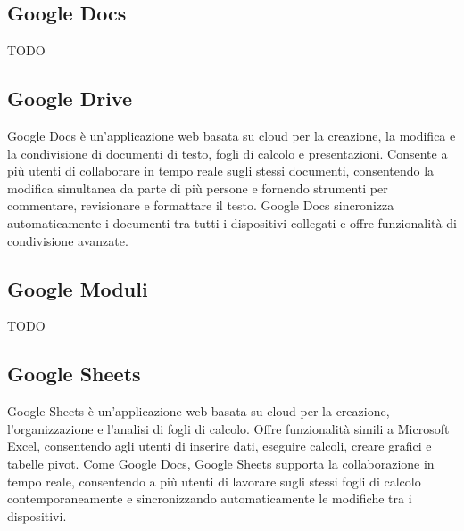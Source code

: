\vspace{2em}
\subsection*{Google Docs}
TODO

\vspace{2em}
\subsection*{Google Drive}
Google Docs è un'applicazione web basata su cloud per la creazione, la modifica e la condivisione di documenti di testo, fogli di calcolo e presentazioni. Consente a più utenti di collaborare in tempo reale sugli stessi documenti, consentendo la modifica simultanea da parte di più persone e fornendo strumenti per commentare, revisionare e formattare il testo. Google Docs sincronizza automaticamente i documenti tra tutti i dispositivi collegati e offre funzionalità di condivisione avanzate.

\vspace{2em}
\subsection*{Google Moduli}
TODO

\vspace{2em}
\subsection*{Google Sheets}
Google Sheets è un'applicazione web basata su cloud per la creazione, l'organizzazione e l'analisi di fogli di calcolo. Offre funzionalità simili a Microsoft Excel, consentendo agli utenti di inserire dati, eseguire calcoli, creare grafici e tabelle pivot. Come Google Docs, Google Sheets supporta la collaborazione in tempo reale, consentendo a più utenti di lavorare sugli stessi fogli di calcolo contemporaneamente e sincronizzando automaticamente le modifiche tra i dispositivi.
